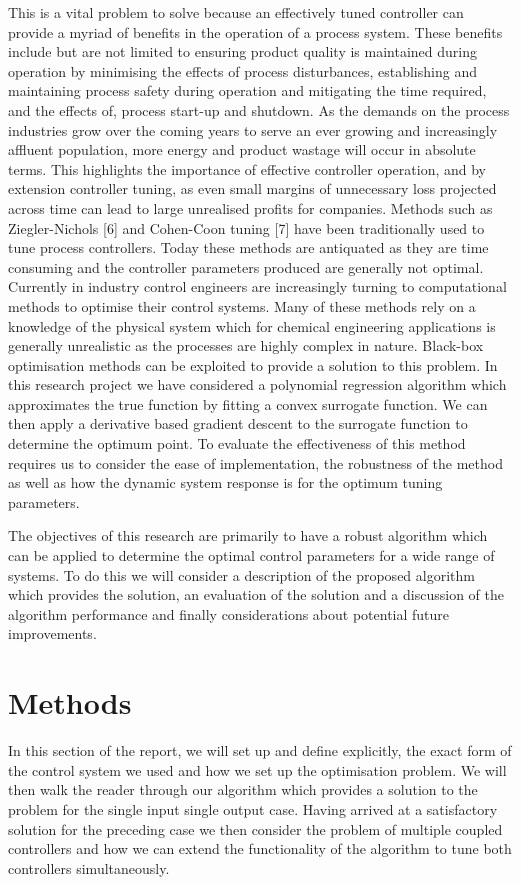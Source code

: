 \documentclass[conference]{IEEEtran}
\theoremstyle{definition}
\begin{document}
\noindent This is a vital problem to solve because an effectively tuned controller can provide a myriad of benefits in the operation of a process system. These benefits include but are not limited to ensuring product quality is maintained during operation by minimising the effects of process disturbances, establishing and maintaining process safety during operation and mitigating the time required, and the effects of, process start-up and shutdown. As the demands on the process industries grow over the coming years to serve an ever growing and increasingly affluent population, more energy and product wastage will occur in absolute terms. This highlights the importance of effective controller operation, and by extension controller tuning, as even small margins of unnecessary loss projected across time can lead to large unrealised profits for companies. Methods such as Ziegler-Nichols [6] and Cohen-Coon tuning [7] have been traditionally used to tune process controllers. Today these methods are  antiquated as they are time consuming and the controller parameters produced are generally not optimal. Currently in industry control engineers are increasingly turning to computational methods to optimise their control systems. Many of these methods rely on a knowledge of the physical system which for chemical engineering applications is generally unrealistic as the processes are highly complex in nature. Black-box optimisation methods can be exploited to provide a solution to this problem. In this research project we have considered a polynomial regression algorithm which approximates the true function by fitting a convex surrogate function. We can then apply a derivative based gradient descent to the surrogate function to determine the optimum point. To evaluate the effectiveness of this method requires us to consider the ease of implementation, the robustness of the method as well as how the dynamic system response is for the optimum tuning parameters.

\noindent The objectives of this research are primarily to have a robust algorithm which can be applied to determine the optimal control parameters for a wide range of systems. To do this we will consider a description of the proposed algorithm which provides the solution, an evaluation of the solution and a discussion of the algorithm performance and finally considerations about potential future improvements.
\section{Methods}
\noindent In this section of the report, we will set up and define explicitly, the exact form of the control system we used and how we set up the optimisation problem. We will then walk the reader through our algorithm which provides a solution to the problem for the single input single output case. Having arrived at a satisfactory solution for the preceding case we then consider the problem of multiple coupled controllers and how we can extend the functionality of the algorithm to tune both controllers simultaneously. 
\end{document}
